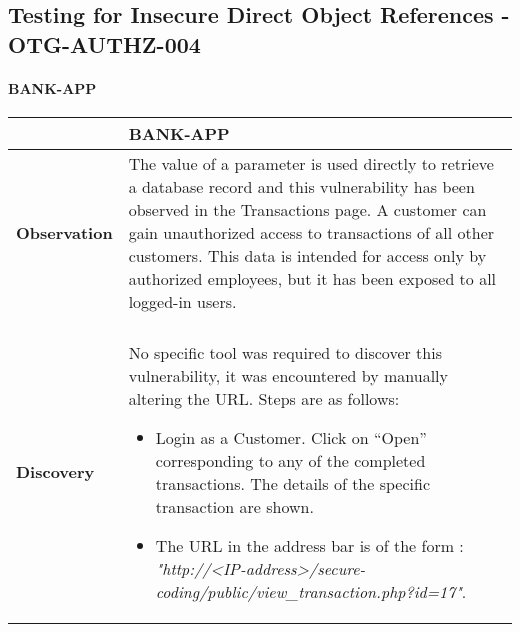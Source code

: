 \subsection{Testing for Insecure Direct Object References - OTG-AUTHZ-004}

\paragraph{BANK-APP} \mbox{}
\begin{longtable*}{p{.20\textwidth} | p{.80\textwidth}}
    \hline
    & \textbf{BANK-APP} \\
    \hline
    \textbf{Observation} &
	The value of a parameter is used directly to retrieve a database record and this vulnerability has been observed in the Transactions page.
	A customer can gain unauthorized access to transactions of all other customers. This data is intended for access only by authorized employees, but it has been exposed to all logged-in users.
    \\\\
    \textbf{Discovery} &
       No specific tool was required to discover this vulnerability, it was encountered by manually altering the URL. Steps are as follows:
       \begin{itemize}
	       \item  Login as a Customer. Click on “Open” corresponding to any of the completed transactions. The details of the specific transaction are shown.

	       \item The URL in the address bar is of the form : \textit{"http://<IP-address>/secure-coding/public/view\_transaction.php?id=17"}.


\end{itemize}
\end{longtable*}
